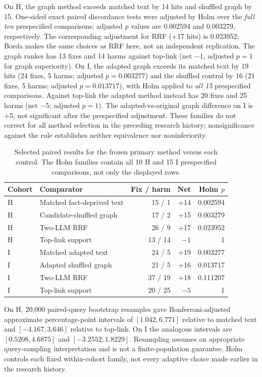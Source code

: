 \documentclass{article}
\begin{document}
On H, the graph method exceeds matched text by 14 hits and shuffled graph by
15. One-sided exact paired discordance tests were adjusted by Holm over the
\emph{full ten} prespecified comparisons; adjusted $p$ values are 0.002594
and 0.003279, respectively. The corresponding adjustment for RRF (+17 hits)
is 0.023952; Borda makes the same choices as RRF here, not an independent
replication. The graph ranker has 13 fixes and 14 harms against top-link (net $-1$,
adjusted $p=1$ for graph superiority). On I, the adapted graph exceeds its
matched text by 19 hits (24 fixes, 5 harms; adjusted $p=0.003277$) and the
shuffled control by 16 (21 fixes, 5 harms; adjusted $p=0.013717$), with Holm
applied to \emph{all 15} prespecified comparisons. Against top-link the adapted
method instead has 20 fixes and 25 harms (net $-5$; adjusted $p=1$). The
adapted-vs-original graph difference on I is +5, not significant after the
prespecified adjustment. These families do not correct for all method
selection in the preceding research history; nonsignificance against the
rule establishes neither equivalence nor noninferiority.

\begin{table}[t]
\centering
\caption{Selected paired results for the frozen primary method versus each
control. The Holm families contain all 10 H and 15 I prespecified comparisons,
not only the displayed rows.}
\label{tab:paired}
\small
\begin{tabular}{llrrr}
\toprule
Cohort & Comparator & Fix / harm & Net & Holm $p$ \\
\midrule
H & Matched fact-deprived text & 15 / 1 & +14 & 0.002594 \\
H & Candidate-shuffled graph & 17 / 2 & +15 & 0.003279 \\
H & Two-LLM RRF & 26 / 9 & +17 & 0.023952 \\
H & Top-link support & 13 / 14 & $-1$ & 1 \\
I & Matched adapted text & 24 / 5 & +19 & 0.003277 \\
I & Adapted shuffled graph & 21 / 5 & +16 & 0.013717 \\
I & Two-LLM RRF & 37 / 19 & +18 & 0.111207 \\
I & Top-link support & 20 / 25 & $-5$ & 1 \\
\bottomrule
\end{tabular}
\end{table}

On H, 20,000 paired-query bootstrap resamples gave Bonferroni-adjusted
approximate percentage-point intervals of $[1.042,6.771]$ relative to matched
text and $[-4.167,3.646]$ relative to top-link. On I the analogous intervals
are $[0.5208,4.6875]$ and $[-3.2552,1.8229]$. Resampling assumes an
appropriate query-sampling interpretation and is not a finite-population
guarantee. Holm controls each fixed within-cohort family, not every adaptive
choice made earlier in the research history.
\end{document}
